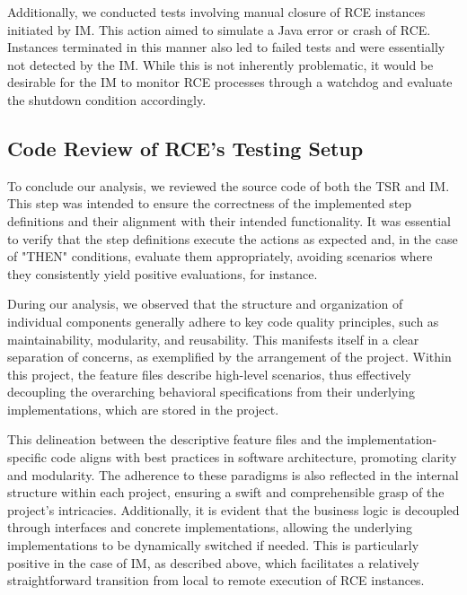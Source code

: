 Additionally, we conducted tests involving manual closure of \ac{RCE} instances initiated by \ac{IM}. This action aimed to simulate a Java error or crash of \ac{RCE}. Instances terminated in this manner also led to failed tests and were essentially not detected by the \ac{IM}. While this is not inherently problematic, it would be desirable for the \ac{IM} to monitor \ac{RCE} processes through a watchdog and evaluate the shutdown condition accordingly.

\subsection{Code Review of \ac{RCE}'s Testing Setup}
\label{subsec:CodeReview}
To conclude our analysis, we reviewed the source code of both the \ac{TSR} and \ac{IM}. This step was intended to ensure the correctness of the implemented step definitions and their alignment with their intended functionality. It was essential to verify that the step definitions execute the actions as expected and, in the case of "THEN" conditions, evaluate them appropriately, avoiding scenarios where they consistently yield positive evaluations, for instance.

During our analysis, we observed that the structure and organization of individual components generally adhere to key code quality principles, such as maintainability, modularity, and reusability. This manifests itself in a clear separation of concerns, as exemplified by the arrangement of the \texttt{} project. Within this project, the feature files describe high-level scenarios, thus effectively decoupling the overarching behavioral specifications from their underlying implementations, which are stored in the \texttt{} project. 

This delineation between the descriptive feature files and the implementation-specific code aligns with best practices in software architecture, promoting clarity and modularity. The adherence to these paradigms is also reflected in the internal structure within each project, ensuring a swift and comprehensible grasp of the project's intricacies. Additionally, it is evident that the business logic is decoupled through interfaces and concrete implementations, allowing the underlying implementations to be dynamically switched if needed. This is particularly positive in the case of \ac{IM}, as described above, which facilitates a relatively straightforward transition from local to remote execution of \ac{RCE} instances. 

